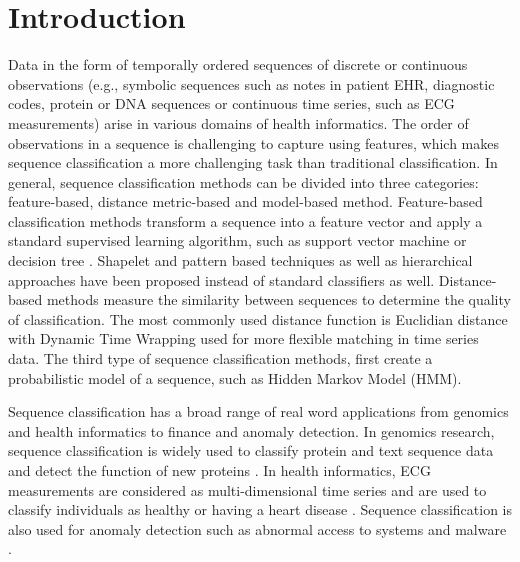 \documentclass{amia}
\begin{document}
\section*{Introduction}
Data in the form of temporally ordered sequences of discrete or continuous observations (e.g., symbolic sequences such as notes in patient EHR, diagnostic codes, protein or DNA sequences or continuous time series, such as ECG measurements) arise in various domains of health informatics. The order of observations in a sequence is challenging to capture using features, which makes sequence classification a more challenging task than traditional classification. In general, sequence classification methods can be divided into three  categories: feature-based, distance metric-based and model-based method. Feature-based classification methods transform a sequence into a feature vector and apply a standard supervised learning algorithm, such as support vector machine \cite{leslie2004fast} or decision tree \cite{chuzhanova1998feature}. Shapelet \cite{ye2009time} and pattern \cite{kudenko1998feature, lesh1999mining} based techniques as well as hierarchical approaches \cite{nallam2016effective} have been proposed instead of standard classifiers as well. Distance-based methods measure the similarity between sequences to determine the quality of classification. The most commonly used distance function is Euclidian distance \cite{keogh2003need} with Dynamic Time Wrapping \cite{keogh2000scaling} used for more flexible matching in time series data. The third type of sequence classification methods, first create a probabilistic model of a sequence, such as Hidden Markov Model \cite{rabiner1989tutorial} (HMM).

Sequence classification has a broad range of real word applications from genomics and health informatics to finance and anomaly detection. In genomics research, sequence classification is widely used to classify protein and text sequence data \cite{yakhnenko2005discriminatively} and detect the function of new proteins \cite{deshpande2002evaluation}. In health informatics, ECG measurements are considered as multi-dimensional time series and are used to classify individuals as healthy or having a heart disease \cite{wei2006semi}. Sequence classification is also used for anomaly detection such as abnormal access to systems \cite{lane1999temporal} and malware \cite{drew2017polymorphic}.    
\end{document}
